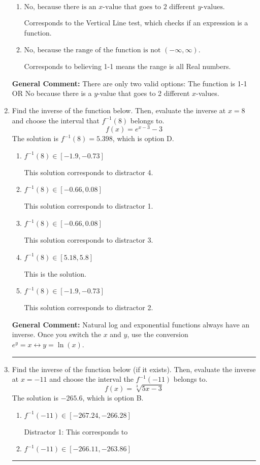 \documentclass{extbook}[14pt]
\newcommand{\litem}[1]{\item #1

\rule{\textwidth}{0.4pt}}
\begin{document}
\begin{enumerate}
{\begin{enumerate}[label=\Alph*.]
* This is the solution.
\item \( \text{No, because there is an $x$-value that goes to 2 different $y$-values.} \)

Corresponds to the Vertical Line test, which checks if an expression is a function.
\item \( \text{No, because the range of the function is not $(-\infty, \infty)$.} \)

Corresponds to believing 1-1 means the range is all Real numbers.
\end{enumerate}

\textbf{General Comment:} There are only two valid options: The function is 1-1 OR No because there is a $y$-value that goes to 2 different $x$-values.
}
\litem{
Find the inverse of the function below. Then, evaluate the inverse at $x = 8$ and choose the interval that $f^{-1}(8)$ belongs to.
\[ f(x) = e^{x-3}-3 \]
The solution is \( f^{-1}(8) = 5.398 \), which is option D.\begin{enumerate}[label=\Alph*.]
\item \( f^{-1}(8) \in [-1.9, -0.73] \)

 This solution corresponds to distractor 4.
\item \( f^{-1}(8) \in [-0.66, 0.08] \)

 This solution corresponds to distractor 1.
\item \( f^{-1}(8) \in [-0.66, 0.08] \)

 This solution corresponds to distractor 3.
\item \( f^{-1}(8) \in [5.18, 5.8] \)

 This is the solution.
\item \( f^{-1}(8) \in [-1.9, -0.73] \)

 This solution corresponds to distractor 2.
\end{enumerate}

\textbf{General Comment:} Natural log and exponential functions always have an inverse. Once you switch the $x$ and $y$, use the conversion $ e^y = x \leftrightarrow y=\ln(x)$.
}
\litem{
Find the inverse of the function below (if it exists). Then, evaluate the inverse at $x = -11$ and choose the interval the $f^{-1}(-11)$ belongs to.
\[ f(x) = \sqrt[3]{5 x - 3} \]
The solution is \( -265.6 \), which is option B.\begin{enumerate}[label=\Alph*.]
\item \( f^{-1}(-11) \in [-267.24, -266.28] \)

 Distractor 1: This corresponds to 
\item \( f^{-1}(-11) \in [-266.11, -263.86] \)


\end{enumerate}}
\end{enumerate}
\end{document}
